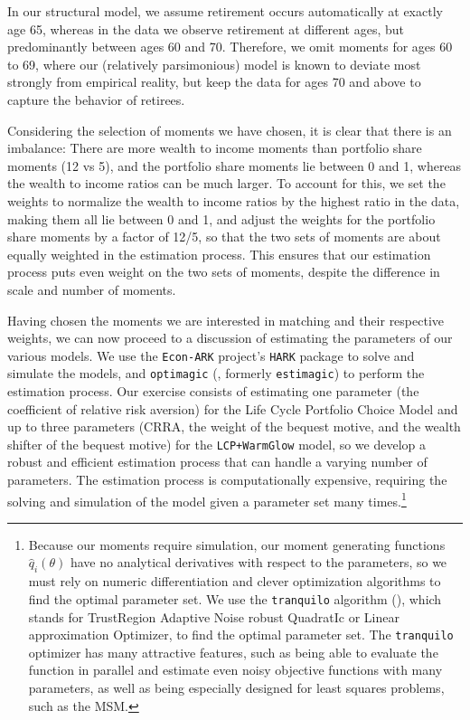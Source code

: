 \documentclass{article}
\begin{document}
In our structural model, we assume retirement occurs automatically at exactly age 65, whereas in the data we observe retirement at different ages, but predominantly between ages 60 and 70.
Therefore, we omit moments for ages 60 to 69, where our (relatively parsimonious) model is known to deviate most strongly from empirical reality, but keep the data for ages 70 and above to capture the behavior of retirees.

Considering the selection of moments we have chosen, it is clear that there is an imbalance:
There are more wealth to income moments than portfolio share moments (12 vs 5), and the portfolio share moments lie between 0 and 1, whereas the wealth to income ratios can be much larger.
To account for this, we set the weights to normalize the wealth to income ratios by the highest ratio in the data, making them all lie between 0 and 1, and adjust the weights for the portfolio share moments by a factor of 12/5, so that the two sets of moments are about equally weighted in the estimation process.
This ensures that our estimation process puts even weight on the two sets of moments, despite the difference in scale and number of moments.

Having chosen the moments we are interested in matching and their respective weights, we can now proceed to a discussion of estimating the parameters of our various models.
We use the \texttt{Econ-ARK} project's \texttt{HARK} package to solve and simulate the models, and \texttt{optimagic} (\cite{Gabler2022}, formerly \texttt{estimagic}) to perform the estimation process.
Our exercise consists of estimating one parameter (the coefficient of relative risk aversion) for the Life Cycle Portfolio Choice Model and up to three parameters (CRRA, the weight of the bequest motive, and the wealth shifter of the bequest motive) for the \texttt{LCP+WarmGlow} model, so we develop a robust and efficient estimation process that can handle a varying number of parameters.
The estimation process is computationally expensive, requiring the solving and simulation of the model given a parameter set many times.\footnote{Because our moments require simulation, our moment generating functions $\hat{q}_i(\theta)$ have no analytical derivatives with respect to the parameters, so we must rely on numeric differentiation and clever optimization algorithms to find the optimal parameter set.
We use the \texttt{tranquilo} algorithm (\cite{Gabler2024}), which stands for TrustRegion Adaptive Noise robust QuadratIc or Linear approximation Optimizer, to find the optimal parameter set.
The \texttt{tranquilo} optimizer has many attractive features, such as being able to evaluate the function in parallel and estimate even noisy objective functions with many parameters, as well as being especially designed for least squares problems, such as the MSM.}
\end{document}
